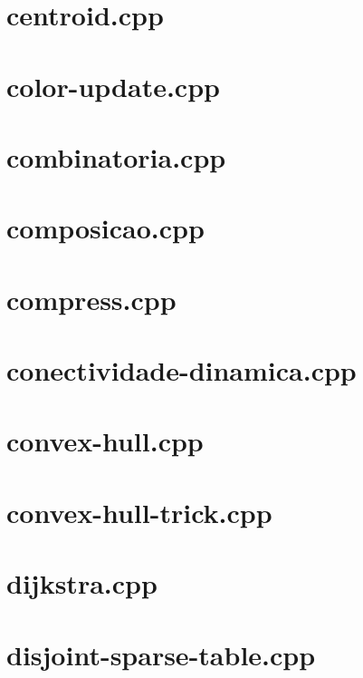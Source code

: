 \documentclass[a4paper,12pt]{article}
\begin{document}
\section{centroid.cpp}


\section{color-update.cpp}


\section{combinatoria.cpp}


\section{composicao.cpp}


\section{compress.cpp}


\section{conectividade-dinamica.cpp}


\section{convex-hull.cpp}


\section{convex-hull-trick.cpp}


\section{dijkstra.cpp}


\section{disjoint-sparse-table.cpp}

\end{document}
